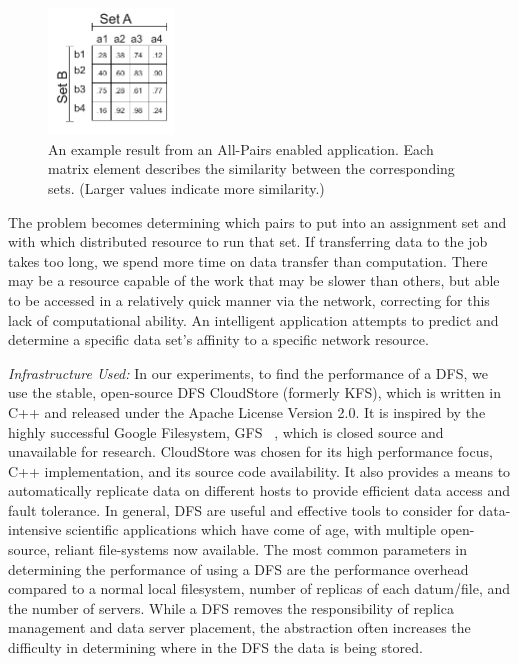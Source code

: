 \documentclass{rspublic}
\begin{document}
\begin{figure}[!ht]
 \begin{center}
     \includegraphics[width=0.3\textwidth]{data/allpairs-exp.pdf}
\end{center}
\caption{\small An example result from an All-Pairs enabled application.
Each matrix element describes the similarity between the corresponding
sets. (Larger values indicate more similarity.)}
 \label{Fig:AllPairsExplanation}
\end{figure}

The problem becomes determining which pairs to put into an assignment
set and with which distributed resource to run that set.  If
transferring data to the job takes too long, we spend more time on
data transfer than computation. There may be a resource capable of the
work that may be slower than others, but able to be accessed in a
relatively quick manner via the network, correcting for this lack of
computational ability. An intelligent application attempts to predict
and determine a specific data set's affinity to a specific network
resource.


{\it Infrastructure Used: } In our experiments, to find the
performance of a DFS, we use the stable, open-source DFS CloudStore
(formerly KFS), which is written in C++ and released under the Apache
License Version 2.0. It is inspired by the highly successful Google
Filesystem, GFS ~\citep{cloudstore_web}, which is closed source and
unavailable for research. CloudStore was chosen for its high
performance focus, C++ implementation, and its source code
availability. It also provides a means to automatically replicate data
on different hosts to provide efficient data access and fault
tolerance. In general, DFS are useful and effective tools to consider
for data-intensive scientific applications which have come of age,
with multiple open-source, reliant file-systems now available.  The
most common parameters in determining the performance of using a DFS
are the performance overhead compared to a normal local filesystem,
number of replicas of each datum/file, and the number of servers.
While a DFS removes the responsibility of replica management and data
server placement, the abstraction often increases the difficulty in
determining where in the DFS the data is being stored.
\end{document}
